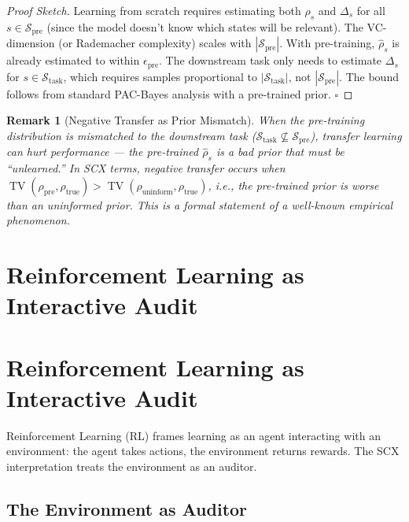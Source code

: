 \documentclass[12pt,a4paper]{article}
\newtheorem{remark}[theorem]{Remark}
\theoremstyle{definition}
\newcommand{\SCX}{\textsc{SCX}}
\DeclareMathOperator{\TV}{TV}
\newcommand{\cS}{\mathcal{S}}
\begin{document}
\begin{proof}[Proof Sketch]
Learning from scratch requires estimating both $\rho_s$ and $\Delta_s$ for all $s \in \cS_{\text{pre}}$ (since the model doesn't know which states will be relevant). The VC-dimension (or Rademacher complexity) scales with $|\cS_{\text{pre}}|$. With pre-training, $\hat{\rho}_s$ is already estimated to within $\epsilon_{\text{pre}}$. The downstream task only needs to estimate $\Delta_s$ for $s \in \cS_{\text{task}}$, which requires samples proportional to $|\cS_{\text{task}}|$, not $|\cS_{\text{pre}}|$. The bound follows from standard PAC-Bayes analysis with a pre-trained prior. \hfill $\square$
\end{proof}

\begin{remark}[Negative Transfer as Prior Mismatch]
When the pre-training distribution is mismatched to the downstream task ($\cS_{\text{task}} \not\subseteq \cS_{\text{pre}}$), transfer learning can \emph{hurt} performance — the pre-trained $\hat{\rho}_s$ is a bad prior that must be ``unlearned.'' In \SCX{} terms, negative transfer occurs when $\TV(\rho_{\text{pre}}, \rho_{\text{true}}) > \TV(\rho_{\text{uninform}}, \rho_{\text{true}})$, i.e., the pre-trained prior is worse than an uninformed prior. This is a formal statement of a well-known empirical phenomenon.
\end{remark}

\section{Reinforcement Learning as Interactive Audit}
\section{Reinforcement Learning as Interactive Audit}
\label{sec:rl}

Reinforcement Learning (RL) frames learning as an agent interacting with an environment: the agent takes actions, the environment returns rewards. The \SCX{} interpretation treats the environment as an auditor.

\subsection{The Environment as Auditor}
\end{document}
